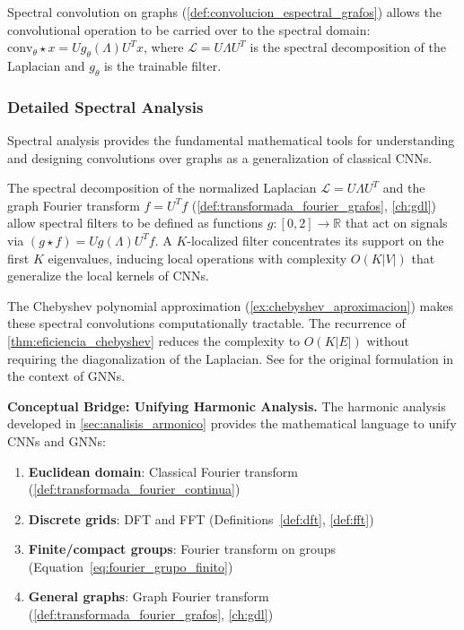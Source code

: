 Spectral convolution on graphs (\autoref{def:convolucion_espectral_grafos}) allows the convolutional operation to be carried over to the spectral domain: $\text{conv}_\theta \star x = U g_\theta(\Lambda) U^T x$, where $\mathcal{L} = U\Lambda U^T$ is the spectral decomposition of the Laplacian and $g_\theta$ is the trainable filter.

\subsubsection{Detailed Spectral Analysis}

Spectral analysis provides the fundamental mathematical tools for understanding and designing convolutions over graphs as a generalization of classical \glspl{CNN}.

The spectral decomposition of the normalized Laplacian $\mathcal{L} = U \Lambda U^T$ and the graph Fourier transform $\hat{f} = U^T f$ (\autoref{def:transformada_fourier_grafos}, \autoref{ch:gdl}) allow spectral filters to be defined as functions $g: [0,2] \to \mathbb{R}$ that act on signals via $(g \star f) = U g(\Lambda) U^T f$. A $K$-localized filter concentrates its support on the first $K$ eigenvalues, inducing local operations with complexity $O(K|V|)$ that generalize the local kernels of \glspl{CNN}.

The Chebyshev polynomial approximation (\autoref{ex:chebyshev_aproximacion}) makes these spectral convolutions computationally tractable. The recurrence of \autoref{thm:eficiencia_chebyshev} reduces the complexity to $O(K|E|)$ without requiring the diagonalization of the Laplacian. See \citep{defferrard2017convolutionalneuralnetworksgraphs} for the original formulation in the context of \glspl{GNN}.

\textbf{Conceptual Bridge: Unifying Harmonic Analysis.} The harmonic analysis developed in \autoref{sec:analisis_armonico} provides the mathematical language to unify CNNs and GNNs:
\begin{enumerate}
    \item \textbf{Euclidean domain}: Classical Fourier transform (\autoref{def:transformada_fourier_continua})
    \item \textbf{Discrete grids}: DFT and FFT (Definitions~\ref{def:dft}, \ref{def:fft})
    \item \textbf{Finite/compact groups}: Fourier transform on groups (Equation~\ref{eq:fourier_grupo_finito})
    \item \textbf{General graphs}: Graph Fourier transform (\autoref{def:transformada_fourier_grafos}, \autoref{ch:gdl})
\end{enumerate}

